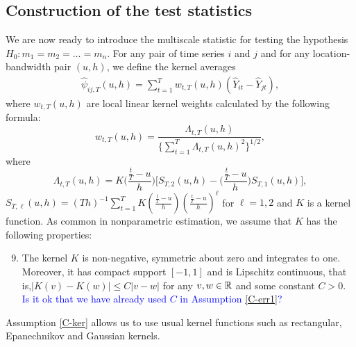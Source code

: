 \documentclass[a4paper,12pt]{article}
\makeatletter
\renewcommand{\eqref}[1]{\tagform@{\ref{#1}}}
\makeatother
\begin{document}


\subsection{Construction of the test statistics}\label{subsec:test:stat}

We are now ready to introduce the multiscale statistic for testing the hypothesis \linebreak $H_0: m_1 = m_2 = \ldots = m_n$. For any pair of time series $i$ and $j$ and for any location-bandwidth pair $(u, h)$, we define the kernel averages
\begin{align}\label{eq:psi_hat_ij}
 \widehat{\psi}_{ij,T}(u,h) = \sum\limits_{t=1}^T w_{t,T}(u,h)(\widehat{Y}_{it} - \widehat{Y}_{jt}),
 \end{align}
where $w_{t,T}(u,h)$ are local linear kernel weights calculated by the following formula:
\begin{equation}\label{eq:weights}
w_{t,T}(u,h) = \frac{\Lambda_{t,T}(u,h)}{ \{\sum\nolimits_{t=1}^T \Lambda_{t,T}(u,h)^2 \}^{1/2} }, 
\end{equation}
where
\[ \Lambda_{t,T}(u,h) = K\Big(\frac{\frac{t}{T}-u}{h}\Big) \Big[ S_{T,2}(u,h) - \Big(\frac{\frac{t}{T}-u}{h}\Big) S_{T,1}(u,h) \Big], \]
$S_{T,\ell}(u,h) = (Th)^{-1} \sum\nolimits_{t=1}^T K(\frac{\frac{t}{T}-u}{h}) (\frac{\frac{t}{T}-u}{h})^\ell$ for $\ell = 1,2$ and $K$ is a kernel function. As common in nonparametric estimation, we assume that $K$ has the following properties: 
\begin{enumerate}[label=(C\arabic*),leftmargin=1.05cm]
\setcounter{enumi}{8}
\item \label{C-ker} The kernel $K$ is non-negative, symmetric about zero and integrates to one. Moreover, it has compact support $[-1,1]$ and is Lipschitz continuous, that is,\linebreak $|K(v) - K(w)| \le C |v-w|$ for any $v,w \in \mathbb{R}$ and some constant $C > 0$. \textcolor{blue}{Is it ok that we have already used $C$ in Assumption \ref{C-err1}?}
\end{enumerate} 
Assumption \ref{C-ker} allows us to use usual kernel functions such as rectangular, Epanechnikov and Gaussian kernels.
\end{document}
